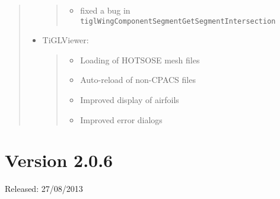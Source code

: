 \documentclass[]{scrartcl}
\begin{document}
\begin{quote}
\begin{itemize}
  \begin{quote}
  \begin{itemize}
  \itemsep1pt\parskip0pt
  \item
    fixed a bug in
    \texttt{tiglWingComponentSegmentGetSegmentIntersection}
  \end{itemize}
  \end{quote}
\item
  TiGLViewer:

  \begin{quote}
  \begin{itemize}
  \itemsep1pt\parskip0pt
  \item
    Loading of HOTSOSE mesh files
  \item
    Auto-reload of non-CPACS files
  \item
    Improved display of airfoils
  \item
    Improved error dialogs
  \end{itemize}
  \end{quote}
\end{itemize}
\end{quote}

\section{Version 2.0.6}\label{version-2.0.6}

Released: 27/08/2013
\end{document}
